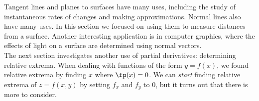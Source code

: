 Tangent lines and planes to surfaces have many uses, including the study of instantaneous rates of changes and making approximations. Normal lines also have many uses. In this section we focused on using them to measure distances from a surface. Another interesting application is in computer graphics, where the effects of light on a surface are determined using normal vectors.\\

The next section investigates another use of partial derivatives: determining relative extrema. When dealing with functions of the form $y=f(x)$, we found relative extrema  by finding $x$ where $\fp(x) = 0$. We can \textit{start} finding relative extrema of $z=f(x,y)$ by setting $f_x$ and $f_y$ to 0, but it turns out that there is more to consider.

